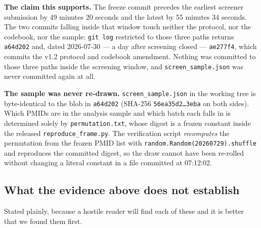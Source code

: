 \documentclass[11pt,a4paper]{article}
\begin{document}
\textbf{The claim this supports.} The freeze commit precedes the earliest screener
submission by 49 minutes 20 seconds and the latest by 55 minutes 34 seconds. The two
commits falling inside that window touch neither the protocol, nor the codebook, nor
the sample: \texttt{git log} restricted to those three paths returns \texttt{a64d202}
and, dated 2026-07-30 --- a day after screening closed --- \texttt{ae277f4}, which
commits the v1.2 protocol and codebook amendment. Nothing was committed to those
three paths inside the screening window, and \texttt{screen\_sample.json} was never
committed again at all.

\textbf{The sample was never re-drawn.} \texttt{screen\_sample.json} in the working
tree is byte-identical to the blob in \texttt{a64d202} (SHA-256
\texttt{56ea35d2\ldots3eba} on both sides). Which PMIDs are in the analysis sample and
which batch each falls in is determined solely by \texttt{permutation.txt}, whose
digest is a frozen constant inside the released \texttt{reproduce\_frame.py}. The
verification script \emph{recomputes} the permutation from the frozen PMID list with
\texttt{random.Random(20260729).shuffle} and reproduces the committed digest, so the
draw cannot have been re-rolled without changing a literal constant in a file
committed at 07:12:02.

\subsection{What the evidence above does not establish}

Stated plainly, because a hostile reader will find each of these and it is better that
we found them first.
\end{document}
